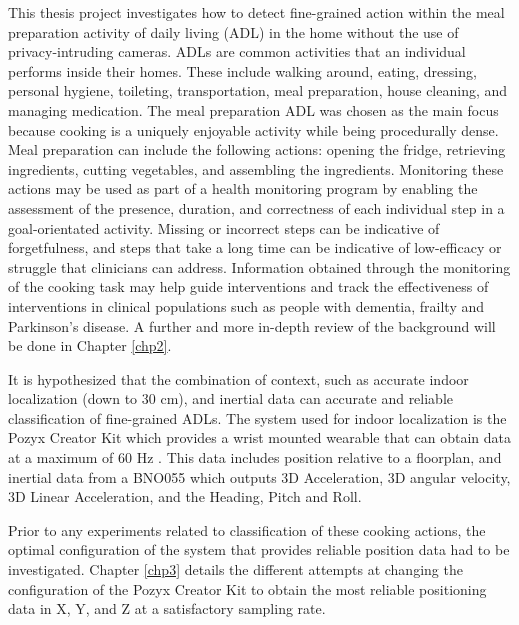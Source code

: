 This thesis project investigates how to detect fine-grained action within the meal preparation activity of daily living 
(ADL) in the home without the use of privacy-intruding cameras. ADLs are common activities that an individual 
performs inside their homes. These include walking around, eating, dressing, personal hygiene, toileting, 
transportation, meal preparation, house cleaning, and managing medication. The meal preparation ADL was chosen as the 
main focus because cooking is a uniquely enjoyable activity while being procedurally dense. 
Meal preparation can include 
the following actions: opening the fridge, retrieving ingredients, cutting vegetables, and assembling the ingredients. 
Monitoring these actions may be used as part of a health monitoring program by enabling the assessment of the presence, 
duration, and correctness of each individual step in a goal-orientated activity. Missing or incorrect steps can be indicative of 
forgetfulness, and steps that take a long time can be indicative of low-efficacy or struggle that clinicians can address.
Information obtained through the monitoring of the cooking task may help guide interventions 
and track the effectiveness of interventions in clinical populations such as people with dementia, frailty and Parkinson's disease. 
A further and more in-depth review of the background will be done in Chapter \ref{chp2}.

It is hypothesized that the combination of context, such as accurate 
indoor localization (down to 30 cm), and inertial data can accurate and reliable 
classification of fine-grained ADLs. 
The system used for indoor localization is the Pozyx Creator Kit which provides a wrist mounted 
wearable that can obtain data at a maximum of 60 Hz \cite{noauthor_creator_nodate}. This data includes position relative to a 
floorplan, and inertial data from a BNO055 which outputs 3D Acceleration, 3D angular velocity, 
3D Linear Acceleration, and the Heading, Pitch and Roll.

Prior to any experiments related to classification of these cooking actions, the optimal 
configuration of the system that provides reliable position data had to be investigated. 
Chapter \ref{chp3} details the different attempts at changing the configuration of the Pozyx 
Creator Kit to obtain the most reliable positioning data in X, Y, and Z at a satisfactory 
sampling rate. 

